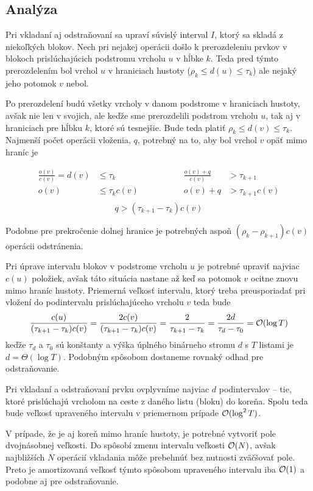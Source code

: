 \subsection{Analýza}

Pri vkladaní aj odstraňovaní sa upraví súvislý interval $I$, ktorý sa skladá z niekoľkých blokov. Nech pri nejakej operácii došlo k prerozdeleniu prvkov v blokoch prislúchajúcich podstromu vrcholu $u$ v hĺbke $k$. Teda pred týmto prerozdelením bol vrchol $u$ v hraniciach hustoty ($\rho_k \le d(u) \le \tau_k$) ale nejaký jeho potomok $v$ nebol.

Po prerozdelení budú všetky vrcholy v danom podstrome v hraniciach hustoty, avšak nie len v svojich, ale keďže sme prerozdelili podstrom vrcholu $u$, tak aj v hraniciach pre hĺbku $k$, ktoré sú tesnejšie. Bude teda platiť $\rho_k \le d(v) \le \tau_k$. Najmenší počet operácii vloženia, $q$, potrebný na to, aby bol vrchol $v$ opäť mimo hraníc je

\[
\begin{aligned}
\frac{o(v)}{c(v)} = d(v) &\le \tau_k \hspace{3cm} & \frac{o(v)+q}{c(v)} &> \tau_{k+1} \\
o(v) &\le \tau_k c(v) & o(v)+q &> \tau_{k+1}c(v) \\
\end{aligned}
\]\[
q > (\tau_{k+1}-\tau_k)c(v)
\]

Podobne pre prekročenie dolnej hranice je potrebných aspoň $(\rho_k-\rho_{k+1})c(v)$ operácii odstránenia.

Pri úprave intervalu blokov v podstrome vrcholu $u$ je potrebné upraviť najviac $c(u)$ položiek, avšak táto situácia nastane až keď sa potomok $v$ ocitne znovu mimo hraníc hustoty. Priemerná veľkosť intervalu, ktorý treba preusporiadať pri vložení do podintervalu prislúchajúceho vrcholu $v$ teda bude
\[
\frac{c(u)}{(\tau_{k+1}-\tau_k)c(v)} = \frac{2c(v)}{(\tau_{k+1}-\tau_k)c(v)} = \frac{2}{\tau_{k+1}-\tau_k} = \frac{2d}{\tau_d-\tau_0} = \mathcal{O}(\log{T})
\]
keďže $\tau_d$ a $\tau_0$ sú konštanty a výška úplného binárneho stromu $d$ s $T$ listami je $d = \Theta(\log{T})$. Podobným spôsobom dostaneme rovnaký odhad pre odstraňovanie.

Pri vkladaní a odstraňovaní prvku ovplyvníme najviac $d$ podintervalov -- tie, ktoré prislúchajú vrcholom na ceste z daného listu (bloku) do koreňa. Spolu teda bude veľkosť upraveného intervalu v priemernom prípade $\mathcal{O}(\log^2{T})$.

V prípade, že je aj koreň mimo hraníc hustoty, je potrebné vytvoriť pole dvojnásobnej veľkosti. Do spôsobí zmenu intervalu veľkosti $\mathcal{O}(N)$, avšak najbližších $N$ operácií vkladania môže prebehnúť bez nutnosti zväčšovať pole. Preto je amortizovaná veľkosť týmto spôsobom upraveného intervalu iba $\mathcal{O}(1)$ a podobne aj pre odstraňovanie.

